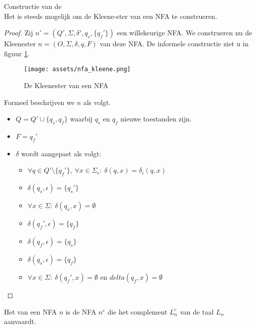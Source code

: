 \documentclass[main.tex]{subfiles}
\begin{document}
\begin{st}
  Constructie van de \\
  Het is steeds mogelijk om de Kleene-ster van een NFA te construeren.

  \begin{proof}
    Zij $n' = (Q',\Sigma,\delta',q_{s},\{q_{f}'\})$ een willekeurige NFA. We construeren nu de Kleenester $n = (O,\Sigma,\delta,q,F)$ van deze NFA.
    De informele constructie ziet u in figuur \ref{fig:nfa_kleene}.
    \begin{figure}[H]
      \centering
      \texttt{[image: assets/nfa\_kleene.png]}      
      \caption{De Kleenester van een NFA}
      \label{fig:nfa_kleene}
    \end{figure}
    Formeel beschrijven we $n$ als volgt.
    \begin{itemize}
    \item $Q = Q' \cup \{ q_{s}, q_{f} \}$ waarbij $q_{s}$ en $q_{f}$ nieuwe toestanden zijn.
    \item $F = {q_{f}'}$
    \item $\delta$ wordt aangepast als volgt:
      \begin{itemize}
      \item $\forall q \in Q'\setminus\{q_{f}'\},\ \forall x \in \Sigma_{\epsilon}:\ \delta(q,x) = \delta_{i}(q,x)$
      \item $\delta(q_{s},\epsilon) = \{q_{s}'\}$
      \item $\forall x \in \Sigma:\ \delta(q_{s},x) = \emptyset$
      \item $\delta(q_{f}',\epsilon) = \{q_{f}\}$
      \item $\delta(q_{f},\epsilon) = \{q_{s}\}$
      \item $\delta(q_{s},\epsilon) = \{q_{f}\}$
      \item $\forall x \in \Sigma:\ \delta(q_{f}',x) = \emptyset$ en $delta(q_{f},x) = \emptyset$
      \end{itemize}
    \end{itemize}
  \end{proof}
\end{st}

\begin{de}
  Het  van een NFA $n$ is de NFA $n^{c}$ die het complement $L_{n}^{c}$ van de taal $L_{n}$ aanvaardt.
\end{de}
\end{document}
